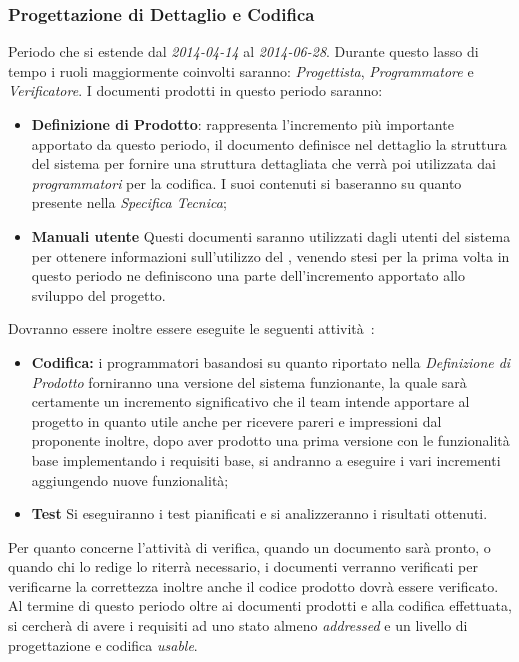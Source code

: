 \subsubsection{Progettazione di Dettaglio e Codifica}
Periodo che si estende dal \textit{2014-04-14} al \textit{2014-06-28}. Durante questo lasso di tempo i ruoli maggiormente coinvolti saranno: \textit{Progettista}, \textit{Programmatore} e \textit{Verificatore}. I documenti prodotti in questo periodo saranno:
\begin{itemize}
	\item \textbf{Definizione di Prodotto}: rappresenta l'incremento più importante apportato da questo periodo, il documento definisce nel dettaglio la struttura del sistema per fornire una struttura dettagliata che verrà poi utilizzata dai \textit{programmatori} per la codifica. I suoi contenuti si baseranno su quanto presente nella \textit{Specifica Tecnica};
	\item \textbf{Manuali utente} Questi documenti saranno utilizzati dagli utenti del sistema per ottenere informazioni sull'utilizzo del \progetto , venendo stesi per la prima volta in questo periodo ne definiscono una parte dell'incremento apportato allo sviluppo del progetto.
\end{itemize}
Dovranno essere inoltre essere eseguite le seguenti attività~:
\begin{itemize}
\item \textbf{Codifica:} i programmatori basandosi su quanto riportato nella \textit{Definizione di Prodotto} forniranno una versione del sistema funzionante, la quale sarà certamente un incremento significativo che il team intende apportare al progetto in quanto utile anche per ricevere pareri e impressioni dal proponente inoltre, dopo aver prodotto una prima versione con le funzionalità base implementando i requisiti base, si andranno a eseguire i vari incrementi aggiungendo nuove funzionalità;
\item \textbf{Test} Si eseguiranno i test pianificati e si analizzeranno i risultati ottenuti.
\end{itemize}
Per quanto concerne l'attività di verifica, quando un documento sarà pronto, o quando chi lo redige lo riterrà necessario, i documenti verranno verificati per verificarne la correttezza inoltre anche il codice prodotto dovrà essere verificato.\\
Al termine di questo periodo oltre ai documenti prodotti e alla codifica effettuata, si cercherà di avere i requisiti ad uno stato almeno \textit{addressed} e un livello di progettazione e codifica \textit{usable}.\\
